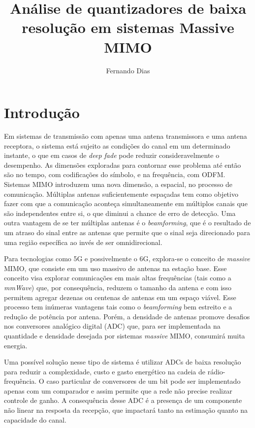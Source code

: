 \documentclass{article}
\title{Análise de quantizadores de baixa resolução em sistemas Massive MIMO}
\author{Fernando Dias}
\date{}
\begin{document}
	\maketitle
	
	\section{Introdução}
	Em sistemas de transmissão com apenas uma antena transmissora e uma antena receptora, o sistema está sujeito as condições do canal em um determinado instante, o que em casos de \textit{deep fade} pode reduzir consideravelmente o desempenho. As dimensões exploradas para contornar esse problema até então são no tempo, com codificações do símbolo, e na frequência, com ODFM. Sistemas MIMO introduzem uma nova dimensão, a espacial, no processo de comunicação. Múltiplas antenas suficientemente espaçadas tem como objetivo fazer com que a comunicação aconteça simultaneamente em múltiplos canais que são independentes entre si, o que diminui a chance de erro de detecção. Uma outra vantagem de se ter múltiplas antenas é o \textit{beamforming}, que é o resultado de um atraso do sinal entre as antenas que permite que o sinal seja direcionado para uma região específica ao invés de ser omnidirecional.

    Para tecnologias como 5G e possivelmente o 6G, explora-se o conceito de \textit{massive} MIMO, que consiste em um uso massivo de antenas na estação base. Esse conceito visa explorar comunicações em mais altas frequências (tais como a \textit{mmWave}) que, por consequência, reduzem o tamanho da antena e com isso permitem agregar dezenas ou centenas de antenas em um espaço viável. Esse processo tem inúmeras vantagens tais como o \textit{beamforming} bem estreito e a redução de potência por antena. Porém, a densidade de antenas promove desafios nos conversores analógico digital (ADC) que, para ser implementada na quantidade e densidade desejada por sistemas \textit{massive} MIMO, consumirá muita energia. 

	Uma possível solução nesse tipo de sistema é utilizar ADCs de baixa resolução para reduzir a complexidade, custo e gasto energético na cadeia de rádio-frequência. O caso particular de conversores de um bit pode ser implementado apenas com um comparador e assim permite que a rede não precise realizar controle de ganho. A consequência desse ADC é a presença de um componente não linear na resposta da recepção, que impactará tanto na estimação quanto na capacidade do canal.
\end{document}
